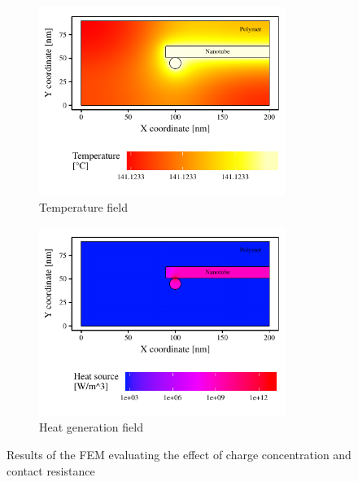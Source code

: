 \documentclass[11pt,review,times]{elsarticle}
\begin{document}
\begin{figure}[htb]
	\centering
	\captionsetup{width=125mm}
	\begin{subfigure}{60mm}
		\centering
		\captionsetup{width=75mm}
		\includegraphics[width=80mm]{resultats_comsol_3D_temp}
		\caption{Temperature field}
		\label{fig:temp_3D}
	\end{subfigure}
	\begin{subfigure}{80mm}
		\centering
		\captionsetup{width=75mm}
		\includegraphics[width=80mm]{resultats_comsol_3D_puissance_log}
		\caption{Heat generation field}
		\label{fig:heat_3D}
	\end{subfigure}
	\caption{Results of the FEM evaluating the effect of charge concentration and contact resistance}
	\label{fig:results_3D}
\end{figure}
\end{document}
